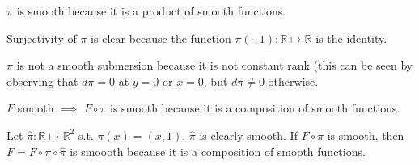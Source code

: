 $\pi$ is smooth because it is a product of smooth functions.

Surjectivity of $\pi$ is clear because the function $\pi(\cdot, 1):\mathbb{R}\mapsto\mathbb{R}$ is the identity.

$\pi$ is not a smooth submersion because it is not constant rank (this can be seen by observing that $d\pi=0$ at $y=0$ or $x=0$, but $d\pi\neq0$ otherwise.

$F$ smooth $\implies$ $F \circ \pi$ is smooth because it is a composition of smooth functions.

Let $\hat{\pi}:\mathbb{R}\mapsto\mathbb{R}^2$ s.t. $\pi(x) = (x,1)$.  $\hat{\pi}$ is clearly smooth. If $F \circ \pi$ is smooth, then $F = F \circ \pi \circ \hat{\pi}$ is smoooth because it is a composition of smooth functions.
